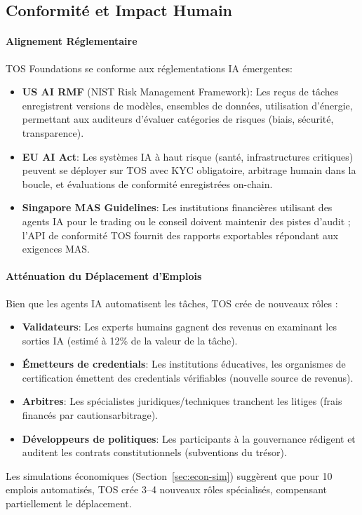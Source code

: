 \documentclass[11pt]{article}
\begin{document}
\subsection{Conformité et Impact Humain}
\paragraph{Alignement Réglementaire} TOS Foundations se conforme aux réglementations IA émergentes:
\begin{itemize}[noitemsep]
  \item \textbf{US AI RMF} (NIST Risk Management Framework): Les reçus de tâches enregistrent versions de modèles, ensembles de données, utilisation d'énergie, permettant aux auditeurs d'évaluer catégories de risques (biais, sécurité, transparence).
  \item \textbf{EU AI Act}: Les systèmes IA à haut risque (santé, infrastructures critiques) peuvent se déployer sur TOS avec KYC obligatoire, arbitrage humain dans la boucle, et évaluations de conformité enregistrées on-chain.
  \item \textbf{Singapore MAS Guidelines}: Les institutions financières utilisant des agents IA pour le trading ou le conseil doivent maintenir des pistes d'audit ; l'API de conformité TOS fournit des rapports exportables répondant aux exigences MAS.
\end{itemize}

\paragraph{Atténuation du Déplacement d'Emplois} Bien que les agents IA automatisent les tâches, TOS crée de nouveaux rôles :
\begin{itemize}[noitemsep]
  \item \textbf{Validateurs}: Les experts humains gagnent des revenus en examinant les sorties IA (estimé à 12\% de la valeur de la tâche).
  \item \textbf{Émetteurs de credentials}: Les institutions éducatives, les organismes de certification émettent des credentials vérifiables (nouvelle source de revenus).
  \item \textbf{Arbitres}: Les spécialistes juridiques/techniques tranchent les litiges (frais financés par cautionsarbitrage).
  \item \textbf{Développeurs de politiques}: Les participants à la gouvernance rédigent et auditent les contrats constitutionnels (subventions du trésor).
\end{itemize}
Les simulations économiques (Section~\ref{sec:econ-sim}) suggèrent que pour 10 emplois automatisés, TOS crée 3--4 nouveaux rôles spécialisés, compensant partiellement le déplacement.
\end{document}
